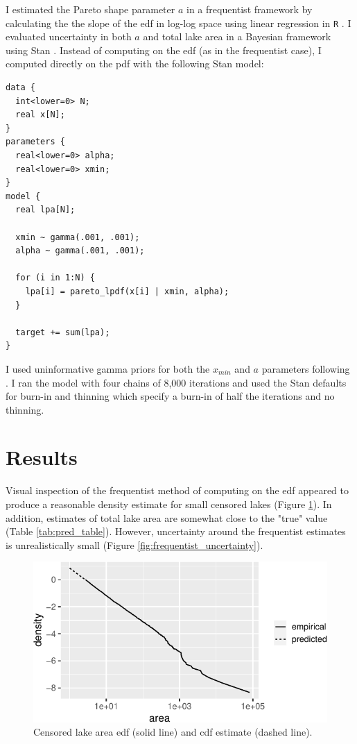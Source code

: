 \documentclass{article}
\begin{document}
I estimated the Pareto shape parameter $a$ in a frequentist framework by calculating the the slope of the edf in log-log space using linear regression in \texttt{R} \citep{team2013r}. I evaluated uncertainty in both $a$ and total lake area in a Bayesian framework using Stan \citep{standevelopmentteamStanModelingLanguage2017}. Instead of computing on the edf (as in the frequentist case), I computed directly on the pdf with the following Stan model:

\begin{minipage}[c]{0.95\textwidth}
\begin{lstlisting}
data {
  int<lower=0> N;
  real x[N];
}
parameters {
  real<lower=0> alpha;
  real<lower=0> xmin;
}
model {
  real lpa[N];

  xmin ~ gamma(.001, .001);
  alpha ~ gamma(.001, .001);

  for (i in 1:N) {
    lpa[i] = pareto_lpdf(x[i] | xmin, alpha);
  }

  target += sum(lpa);
}
\end{lstlisting}
\end{minipage}

I used uninformative gamma priors for both the $x_{min}$ and $a$ parameters following \citet{scollnikCompositeLognormalParetoModels2007}. I ran the model with four chains of 8,000 iterations and used the Stan defaults for burn-in and thinning which specify a burn-in of half the iterations and no thinning.

\section{Results}

Visual inspection of the frequentist method of computing on the edf appeared to produce a reasonable density estimate for small censored lakes (Figure \ref{fig:predict_area}). In addition, estimates of total lake area are somewhat close to the "true" value (Table \ref{tab:pred_table}). However, uncertainty around the frequentist estimates is unrealistically small (Figure \ref{fig:frequentist_uncertainty}).

\begin{figure}
	\centering
	\includegraphics{figures/predict_area-1}
	\caption{Censored lake area edf (solid line) and cdf estimate (dashed line).}
	\label{fig:predict_area}
\end{figure}
\end{document}
